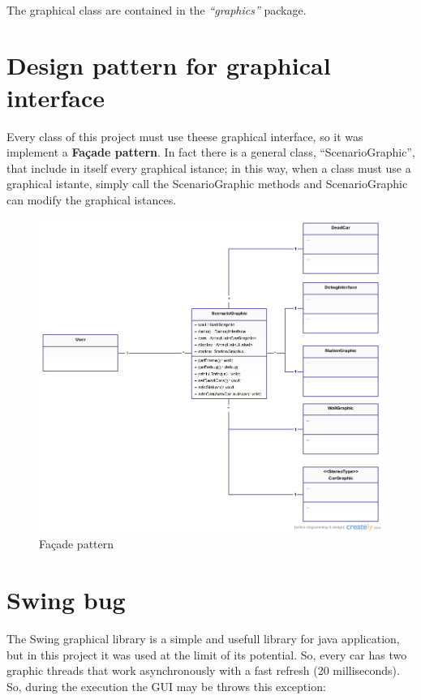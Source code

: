 \documentclass[a4paper,titlepage]{article}
\begin{document}
~

The graphical class are contained in the \textit{``graphics''} package.

\section{Design pattern for graphical interface}

Every class of this project must use theese graphical interface, so it was implement a \textbf{Façade pattern}. In fact there is a general class, ``ScenarioGraphic'', that include in itself every graphical istance; in this way, when a class must use a graphical istante, simply call the ScenarioGraphic methods and ScenarioGraphic can modify the graphical istances. 
\newpage
\begin{figure}[!ht]
\centering
\includegraphics[scale=0.4]{facade.png}
\caption{Façade pattern}
\end{figure}

\newpage

\section{Swing bug}

The Swing graphical library is a simple and usefull library for java application, but in this project it was used at the limit of its potential. So, every car has two graphic threads that work asynchronously with a fast refresh (20 milliseconds). So, during the execution the GUI may be throws this exception: 
\end{document}
